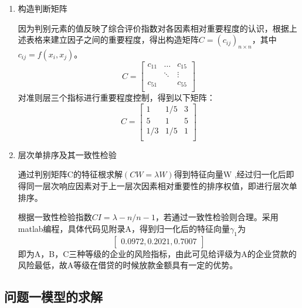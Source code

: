 \documentclass[dvipsnames,withoutpreface,bwprint]{cumcmthesis}
\begin{document}
\begin{enumerate}[label=(\arabic*)]
    \item 构造判断矩阵
    \par \qquad 因为判别元素的值反映了综合评价指数对各因素相对重要程度的认识，根据上述表格来建立因子之间的重要程度，得出构造矩阵$C=(c_{ij})_{n \times n}$，其中$c_{ij}=f(x_i,x_j)$。
    \[C=\begin{bmatrix}
        c_{11} &\dots &c_{15} \\
        & \ddots & \vdots \\
        c_{51} & &c_{55} \\
    \end{bmatrix}\]
    对准则层三个指标进行重要程度控制，得到以下矩阵：
    \[C=\begin{bmatrix}
        1 &1/5 &3 \\
        5 &1 &5 \\
        1/3 &1/5 &1 \\
    \end{bmatrix}\]
    \item 层次单排序及其一致性检验
    \par \qquad 通过判别矩阵C的特征根求解$(CW=\lambda W)$得到特征向量W ,经过归一化后即得同一层次响应因素对于上一层次因素相对重要性的排序权值，即进行层次单排序。
    \par 根据一致性检验指数$CI=\lambda-n/n-1$，若通过一致性检验则合理。采用matlab编程，具体代码见附录A，得到归一化后的特征向量$\gamma_1$为
    \[\begin{bmatrix}
            0.0972,0.2021,0.7007
    \end{bmatrix}\]
    即为A，B，C三种等级的企业的风险指标，由此可见给评级为A的企业贷款的风险最低，故A等级在借贷的时候放款金额具有一定的优势。
\end{enumerate}
\subsection{问题一模型的求解}
\end{document}
